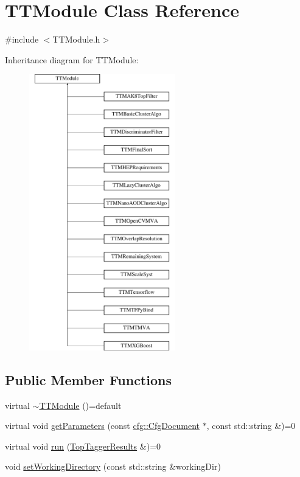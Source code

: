 \hypertarget{classTTModule}{\section{T\-T\-Module Class Reference}
\label{classTTModule}
}


{\ttfamily \#include $<$T\-T\-Module.\-h$>$}

Inheritance diagram for T\-T\-Module\-:\begin{figure}[H]
\begin{center}
\leavevmode
\includegraphics[height=12.000000cm]{classTTModule}
\end{center}
\end{figure}
\subsection*{Public Member Functions}
\begin{DoxyCompactItemize}
\item 
virtual \hyperlink{classTTModule_a270f4faaa37f3fb382fb5fa91cdf1899}{$\sim$\-T\-T\-Module} ()=default
\item 
virtual void \hyperlink{classTTModule_aa9d2842c9e94782059fe92044a68e3a6}{get\-Parameters} (const \hyperlink{classcfg_1_1CfgDocument}{cfg\-::\-Cfg\-Document} $\ast$, const std\-::string \&)=0
\item 
virtual void \hyperlink{classTTModule_a14e7c03fbf4ee1a5008c9344adc7c896}{run} (\hyperlink{classTopTaggerResults}{Top\-Tagger\-Results} \&)=0
\item 
void \hyperlink{classTTModule_a0f9c9948826e630e6c6e7943e98a1f37}{set\-Working\-Directory} (const std\-::string \&working\-Dir)
\end{DoxyCompactItemize}
